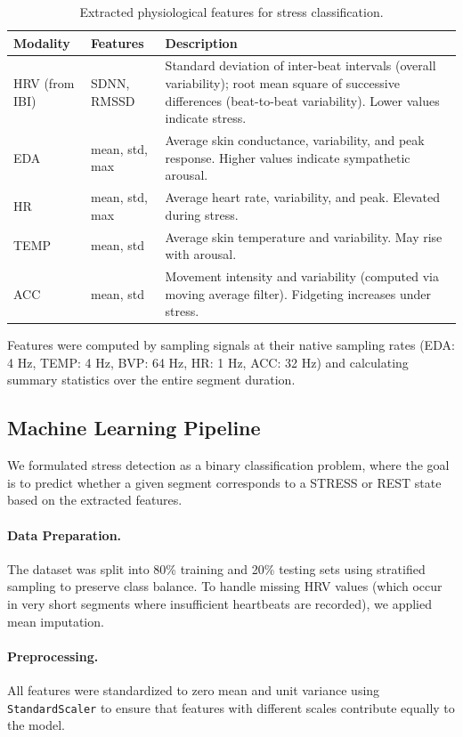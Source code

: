 \documentclass[12pt,letterpaper]{article}
\begin{document}
\begin{table}[H]
\centering
\caption{Extracted physiological features for stress classification.}
\label{tab:features}
\begin{tabular}{p{3cm}p{4cm}p{7cm}}
\toprule
\textbf{Modality} & \textbf{Features} & \textbf{Description} \\
\midrule
HRV (from IBI) & SDNN, RMSSD & Standard deviation of inter-beat intervals (overall variability); root mean square of successive differences (beat-to-beat variability). Lower values indicate stress. \\[4pt]
EDA & mean, std, max & Average skin conductance, variability, and peak response. Higher values indicate sympathetic arousal. \\[4pt]
HR & mean, std, max & Average heart rate, variability, and peak. Elevated during stress. \\[4pt]
TEMP & mean, std & Average skin temperature and variability. May rise with arousal. \\[4pt]
ACC & mean, std & Movement intensity and variability (computed via moving average filter). Fidgeting increases under stress. \\
\bottomrule
\end{tabular}
\end{table}

Features were computed by sampling signals at their native sampling rates (EDA: 4 Hz, TEMP: 4 Hz, BVP: 64 Hz, HR: 1 Hz, ACC: 32 Hz) and calculating summary statistics over the entire segment duration.

\subsection{Machine Learning Pipeline}

We formulated stress detection as a binary classification problem, where the goal is to predict whether a given segment corresponds to a STRESS or REST state based on the extracted features.

\paragraph{Data Preparation.} The dataset was split into 80\% training and 20\% testing sets using stratified sampling to preserve class balance. To handle missing HRV values (which occur in very short segments where insufficient heartbeats are recorded), we applied mean imputation.

\paragraph{Preprocessing.} All features were standardized to zero mean and unit variance using \texttt{StandardScaler} to ensure that features with different scales contribute equally to the model.
\end{document}
